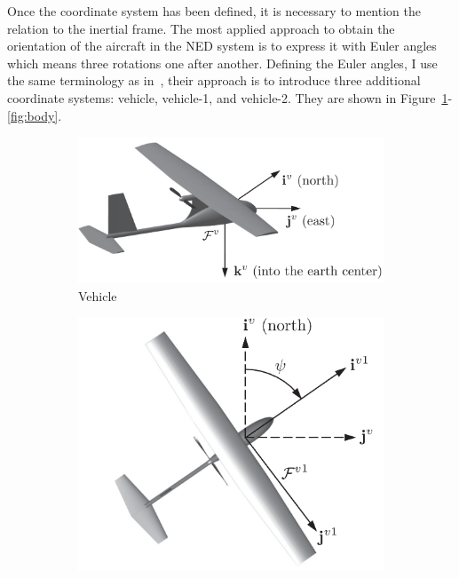 Once the coordinate system has been defined, it is necessary to mention the relation to the inertial frame. The most applied approach to obtain the orientation of the aircraft in the NED system is to express it with Euler angles which means three rotations one after another. Defining the Euler angles, I use the same terminology as in~\cite{EKF-UAS-2}, their approach is to introduce three additional coordinate systems: vehicle, vehicle-1, and vehicle-2. They are shown in Figure~\ref{fig:vehicle}-\ref{fig:body}.

\begin{figure}[!ht]
    \centering
    \begin{subfigure}{0.38\textwidth}
        \centering
         \includegraphics[width=\textwidth]{figures/vehicle.png}
         \caption{Vehicle}\label{fig:vehicle}
    \end{subfigure}
    \begin{subfigure}{0.38\textwidth}
        \centering
         \includegraphics[width=\textwidth]{figures/vehicle-1.png}

\end{subfigure}
\end{figure}
